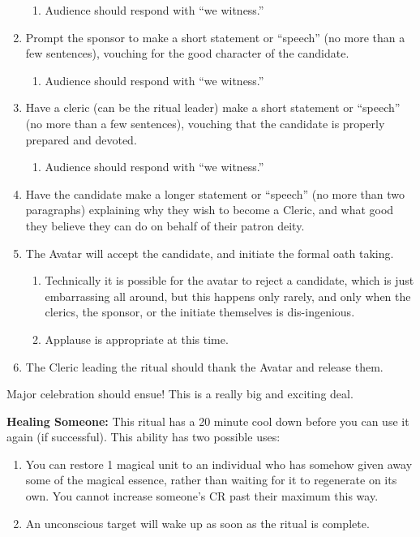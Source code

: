 \documentclass[green]{GL2020}
\begin{document}
\begin{enumerate}
\begin{enumerate}
      \item Audience should respond with ``we witness.''
    \end{enumerate}
    \item Prompt the sponsor to make a short statement or ``speech'' (no more than a few sentences), vouching for the good character of the candidate.
    \begin{enumerate}
      \item Audience should respond with ``we witness.''
    \end{enumerate}
    \item Have a cleric (can be the ritual leader) make a short statement or ``speech'' (no more than a few sentences), vouching that the candidate is properly prepared and devoted.
    \begin{enumerate}
      \item Audience should respond with ``we witness.''
    \end{enumerate}
    \item Have the candidate make a longer statement or ``speech'' (no more than two paragraphs) explaining why they wish to become a Cleric, and what good they believe they can do on behalf of their patron deity.
    \item The Avatar will accept the candidate, and initiate the formal oath taking.
    \begin{enumerate}
      \item Technically it is possible for the avatar to reject a candidate, which is just embarrassing all around, but this happens only rarely, and only when the clerics, the sponsor, or the initiate themselves is dis-ingenious.
      \item Applause is appropriate at this time.
    \end{enumerate}
    \item The Cleric leading the ritual should thank the Avatar and release them.
  \end{enumerate}
Major celebration should ensue! This is a really big and exciting deal.

\textbf{Healing Someone:}
This ritual has a 20 minute cool down before you can use it again (if successful). This ability has two possible uses:
  \begin{enumerate}
    \item You can restore 1 magical unit to an individual who has somehow given away some of the magical essence, rather than waiting for it to regenerate on its own. You cannot increase someone’s CR past their maximum this way.
    \item An unconscious target will wake up as soon as the ritual is complete.
  \end{enumerate}
\end{document}
